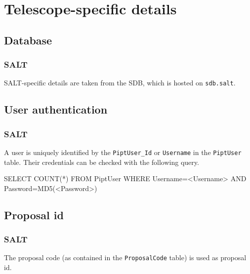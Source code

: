 \section{Telescope-specific details}
\label{app:telescopes}

\subsection{Database}

\subsubsection{SALT}

SALT-specific details are taken from the \acrfull{SDB}, which is hosted on \verb|sdb.salt|.

\subsection{User authentication}

\subsubsection{SALT}

A user is uniquely identified by the \verb|PiptUser_Id| or \verb|Username| in the \verb|PiptUser| table. Their credentials can be checked with the following query.

\begin{code}
SELECT COUNT(*) FROM PiptUser
       WHERE Username=<Username> AND Password=MD5(<Password>)
\end{code}

\subsection{Proposal id}

\subsubsection{SALT}

The proposal code (as contained in the \verb|ProposalCode| table) is used as proposal id.